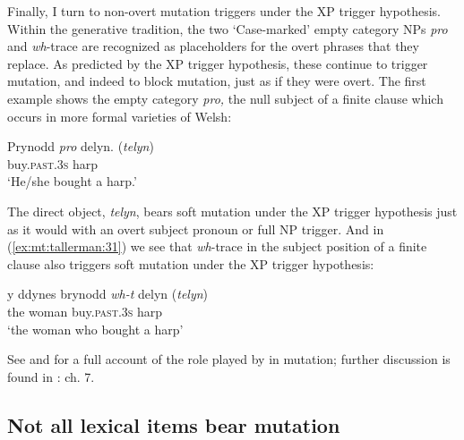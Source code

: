 \documentclass[output=paper,colorlinks,citecolor=brown]{langscibook}
\begin{document}
{Finally, I turn to non-overt mutation triggers under the XP trigger hypothesis. Within the generative tradition, the two ‘Case-marked’ empty category NPs} {\textit{pro}}{ and} {\textit{wh}}{{}-trace are recognized as placeholders for the overt phrases that they replace. As predicted by the XP trigger hypothesis, these  continue to trigger mutation, and indeed to block mutation, just as if they were overt. The first example shows the empty category} {\textit{pro,} }{the null subject of a finite clause which occurs in more formal varieties of Welsh:}

\ea\label{ex:mt:tallerman:30}
\gll Prynodd \textit{pro} delyn.       (\textit{telyn}) \\
buy.\textsc{past.3s} {} harp \\
\glt ‘He/she bought a harp.’
\z

The direct object, \textit{telyn}{, bears  soft mutation under the XP trigger hypothesis just as it would with an overt subject pronoun or full NP trigger. And in (\ref{ex:mt:tallerman:31}) we see that} {\textit{wh}}{{}-trace in the subject position of a finite clause also triggers  soft mutation under the XP trigger hypothesis:} 

\ea\label{ex:mt:tallerman:31}
\gll y ddynes brynodd \textit{wh-t} delyn    ({\textit{telyn}})\\
the woman buy.\textsc{past.3s} {} harp\\
\glt ‘the woman who bought a harp’
\z

See \citet{Tallerman2006} and \citet{Tallerman2009} for a full account of the role played by  in mutation; further discussion is found in \citet{BorsleyEtAl2007}: ch. 7. 


\subsection{Not all lexical items bear mutation}
\end{document}
